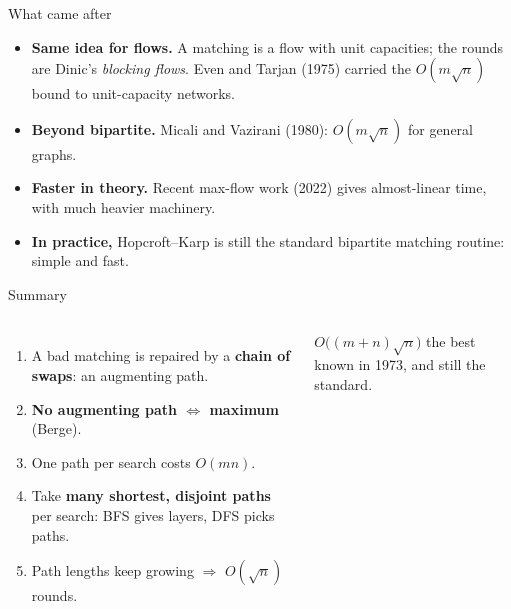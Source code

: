 \documentclass[aspectratio=169,11pt]{beamer}
\begin{document}
\begin{frame}{What came after}
\begin{itemize}\setlength\itemsep{9pt}
  \item \textbf{Same idea for flows.} A matching is a flow with unit capacities; the rounds are Dinic's \emph{blocking flows}. Even and Tarjan (1975) carried the $O(m\sqrt n)$ bound to unit-capacity networks.
  \item \textbf{Beyond bipartite.} Micali and Vazirani (1980): $O(m\sqrt n)$ for general graphs.
  \item \textbf{Faster in theory.} Recent max-flow work (2022) gives almost-linear time, with much heavier machinery.
  \item \textbf{In practice,} Hopcroft--Karp is still the standard bipartite matching routine: simple and fast.
\end{itemize}
\end{frame}

\begin{frame}{Summary}
\begin{columns}[T]
\begin{enumerate}\setlength\itemsep{8pt}
  \item A bad matching is repaired by a \textbf{chain of swaps}: an augmenting path.
  \item \textbf{No augmenting path $\Leftrightarrow$ maximum} (Berge).
  \item One path per search costs $O(mn)$.
  \item Take \textbf{many shortest, disjoint paths} per search: BFS gives layers, DFS picks paths.
  \item Path lengths keep growing $\Rightarrow$ $O(\sqrt n)$ rounds.
\end{enumerate}
\begin{alertblock}{$O\big((m+n)\sqrt n\big)$}
the best known in 1973, and still the standard.
\end{alertblock}
\vspace{6mm}
\end{columns}
\end{frame}
\end{document}
